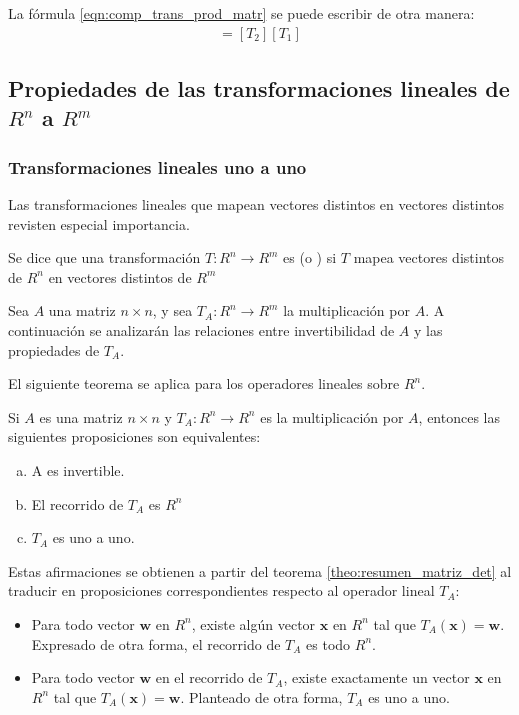 \documentclass[a4paper,12pt]{article}
\begin{document}
La fórmula \eqref{eqn:comp_trans_prod_matr} se puede escribir de otra manera:
\begin{align*}
  [T_2 \circ T_1]=[T_2][T_1]
\end{align*}


\subsection{Propiedades de las transformaciones lineales de $R^n$ a $R^m$}

\subsubsection{Transformaciones lineales uno a uno}

Las transformaciones lineales que mapean vectores distintos en vectores
distintos revisten especial importancia.

\begin{concept}
  Se dice que una transformación $T:R^n\rightarrow R^m$ es 
  (o ) si $T$ mapea vectores distintos de $R^n$ en vectores
  distintos de $R^m$
\end{concept}

Sea $A$ una matriz $n\times n$, y sea $T_A:R^n\rightarrow R^m$ la
multiplicación por $A$. A continuación se analizarán las relaciones entre
invertibilidad de $A$ y las propiedades de $T_A$.

El siguiente teorema se aplica para los operadores lineales sobre $R^n$.
\begin{theorem}
  Si $A$ es una matriz $n\times n$ y $T_A:R^n\rightarrow R^n$ es la
  multiplicación por $A$, entonces las siguientes proposiciones son
  equivalentes:
  \begin{enumerate}[(a)]
    \item A es invertible.
    \item El recorrido de $T_A$ es $R^n$
    \item $T_A$ es uno a uno.
  \end{enumerate}
  \label{theo:equiv_oper_lin}
\end{theorem}
Estas afirmaciones se obtienen a partir del teorema
\ref{theo:resumen_matriz_det} al traducir en proposiciones correspondientes
respecto al operador lineal $T_A$:
\begin{itemize}
  \item Para todo vector $\mathbf{w}$ en $R^n$, existe algún vector
    $\mathbf{x}$ en $R^n$ tal que $T_A(\mathbf{x})=\mathbf{w}$. Expresado de
    otra forma, el recorrido de $T_A$ es todo $R^n$.
  \item Para todo vector $\mathbf{w}$ en el recorrido de $T_A$, existe
    exactamente un vector $\mathbf{x}$ en $R^n$ tal que
    $T_A(\mathbf{x})=\mathbf{w}$. Planteado de otra forma, $T_A$ es uno a uno.
\end{itemize}
\end{document}

